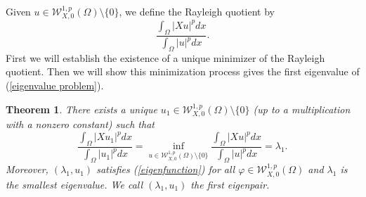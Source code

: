 \documentclass[a4paper,12pt,reqno]{amsart}
\renewcommand\eqref[1]{(\ref{#1})} %
\numberwithin{equation}{section}
\theoremstyle{plain}
\newtheorem{theorem}{Theorem}[section]
\theoremstyle{definition}
\begin{document}
Given $u \in \mathcal{W}_{X,0}^{1, p}(\Omega) \setminus\{0\}$, we define the Rayleigh quotient by
$$
\frac{\int_{\Omega}|X u|^p d x}{\int_{\Omega}|u|^p d x} .
$$
First we will establish the existence of a unique minimizer of the Rayleigh quotient.
Then we will show this minimization process gives the first eigenvalue of \eqref{eigenvalue problem}. 
\begin{theorem}\label{existence and uniqueness of the Rayleigh quotient}
There exists a unique   $u_{1}\in \mathcal{W}_{X,0}^{1, p}(\Omega)\setminus\{0\}$ (up to a multiplication with a nonzero constant)  such that
$$\frac{\int_{\Omega}|X u_{1}|^p d x}{\int_{\Omega}|u_{1}|^p d x} =\inf_{u \in \mathcal{W}_{X,0}^{1, p}(\Omega)\setminus\{0\}}\frac{\int_{\Omega}|X u|^p d x}{\int_{\Omega}|u|^p d x} =\lambda_{1}.$$
Moreover, $(\lambda_{1}, u_{1})$ satisfies \eqref{eigenfunction} for all  $\varphi\in \mathcal{W}_{X,0}^{1, p}(\Omega)$ and $\lambda_{1}$ is the smallest eigenvalue. We call $(\lambda_{1}, u_{1})$ the first eigenpair.
\end{theorem}
\end{document}
